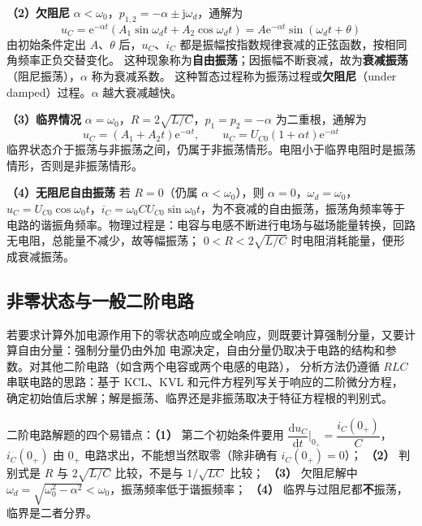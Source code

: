 \textbf{（2）欠阻尼} $\alpha<\omega_0$，$p_{1,2}=-\alpha\pm\mathrm{j}\omega_d$，通解为
\begin{equation}
  u_C=\mathrm{e}^{-\alpha t}\left(A_1\sin\omega_dt+A_2\cos\omega_dt\right)
     =A\mathrm{e}^{-\alpha t}\sin\left(\omega_dt+\theta\right)
\end{equation}
由初始条件定出 $A$、$\theta$ 后，$u_C$、$i_C$ 都是振幅按指数规律衰减的正弦函数，按相同角频率正负交替变化。
这种现象称为\textbf{自由振荡}；因振幅不断衰减，故为\textbf{衰减振荡}（阻尼振荡），$\alpha$ 称为衰减系数。
这种暂态过程称为振荡过程或\textbf{欠阻尼}（under damped）过程。$\alpha$ 越大衰减越快。

\textbf{（3）临界情况} $\alpha=\omega_0$，$R=2\sqrt{L/C}$，$p_1=p_2=-\alpha$ 为二重根，通解为
\begin{equation}
  u_C=(A_1+A_2t)\mathrm{e}^{-\alpha t},\qquad
  u_C=U_{C0}(1+\alpha t)\mathrm{e}^{-\alpha t}
\end{equation}
临界状态介于振荡与非振荡之间，仍属于非振荡情形。电阻小于临界电阻时是振荡情形，否则是非振荡情形。

\textbf{（4）无阻尼自由振荡} 若 $R=0$（仍属 $\alpha<\omega_0$），则 $\alpha=0$，$\omega_d=\omega_0$，
$u_C=U_{C0}\cos\omega_0t$，$i_C=\omega_0CU_{C0}\sin\omega_0t$，为不衰减的自由振荡，振荡角频率等于
电路的谐振角频率。物理过程是：电容与电感不断进行电场与磁场能量转换，回路无电阻，总能量不减少，故等幅振荡；
$0<R<2\sqrt{L/C}$ 时电阻消耗能量，便形成衰减振荡。

\subsection{非零状态与一般二阶电路}
若要求计算外加电源作用下的零状态响应或全响应，则既要计算强制分量，又要计算自由分量：强制分量仍由外加
电源决定，自由分量仍取决于电路的结构和参数。对其他二阶电路（如含两个电容或两个电感的电路），
分析方法仍遵循 $RLC$ 串联电路的思路：基于 KCL、KVL 和元件方程列写关于响应的二阶微分方程，
确定初始值后求解；解是振荡、临界还是非振荡取决于特征方程根的判别式。

\begin{corepoint}{二阶电路解题的四个易错点：\textbf{（1）} 第二个初始条件要用 $\dfrac{\mathrm{d}u_C}{\mathrm{d}t}\Big|_{0_+}=\dfrac{i_C(0_+)}{C}$，
$i_C(0_+)$ 由 $0_+$ 电路求出，不能想当然取零（除非确有 $i_C(0_+)=0$）；
\textbf{（2）} 判别式是 $R$ 与 $2\sqrt{L/C}$ 比较，不是与 $1/\sqrt{LC}$ 比较；
\textbf{（3）} 欠阻尼解中 $\omega_d=\sqrt{\omega_0^2-\alpha^2}<\omega_0$，振荡频率低于谐振频率；
\textbf{（4）} 临界与过阻尼都\textbf{不}振荡，临界是二者分界。}
\end{corepoint}

